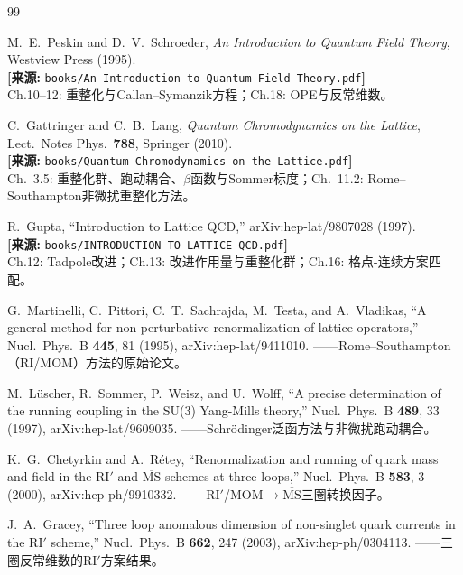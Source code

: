 \documentclass[12pt,a4paper]{ctexart}
\theoremstyle{definition}
\begin{document}
\begin{thebibliography}{99}

M.~E.~Peskin and D.~V.~Schroeder, \textit{An Introduction to Quantum Field Theory}, Westview Press (1995).
\\\textbf{[来源:} \texttt{books/An Introduction to Quantum Field Theory.pdf}\textbf{]}
\\Ch.10--12: 重整化与Callan--Symanzik方程；Ch.18: OPE与反常维数。

C.~Gattringer and C.~B.~Lang, \textit{Quantum Chromodynamics on the Lattice}, Lect.\ Notes Phys.\ \textbf{788}, Springer (2010).
\\\textbf{[来源:} \texttt{books/Quantum Chromodynamics on the Lattice.pdf}\textbf{]}
\\Ch.~3.5: 重整化群、跑动耦合、$\beta$函数与Sommer标度；Ch.~11.2: Rome--Southampton非微扰重整化方法。

R.~Gupta, ``Introduction to Lattice QCD,'' arXiv:hep-lat/9807028 (1997).
\\\textbf{[来源:} \texttt{books/INTRODUCTION TO LATTICE QCD.pdf}\textbf{]}
\\Ch.12: Tadpole改进；Ch.13: 改进作用量与重整化群；Ch.16: 格点-连续方案匹配。

G.~Martinelli, C.~Pittori, C.~T.~Sachrajda, M.~Testa, and A.~Vladikas,
``A general method for non-perturbative renormalization of lattice operators,''
Nucl.\ Phys.\ B \textbf{445}, 81 (1995), arXiv:hep-lat/9411010.
——Rome--Southampton（RI/MOM）方法的原始论文。

M.~L\"uscher, R.~Sommer, P.~Weisz, and U.~Wolff,
``A precise determination of the running coupling in the SU(3) Yang-Mills theory,''
Nucl.\ Phys.\ B \textbf{489}, 33 (1997), arXiv:hep-lat/9609035.
——Schr\"odinger泛函方法与非微扰跑动耦合。

K.~G.~Chetyrkin and A.~R\'etey,
``Renormalization and running of quark mass and field in the RI$'$ and $\overline{\text{MS}}$ schemes at three loops,''
Nucl.\ Phys.\ B \textbf{583}, 3 (2000), arXiv:hep-ph/9910332.
——RI$'$/MOM$\to\overline{\text{MS}}$三圈转换因子。

J.~A.~Gracey,
``Three loop anomalous dimension of non-singlet quark currents in the RI$'$ scheme,''
Nucl.\ Phys.\ B \textbf{662}, 247 (2003), arXiv:hep-ph/0304113.
——三圈反常维数的RI$'$方案结果。


\end{thebibliography}
\end{document}
